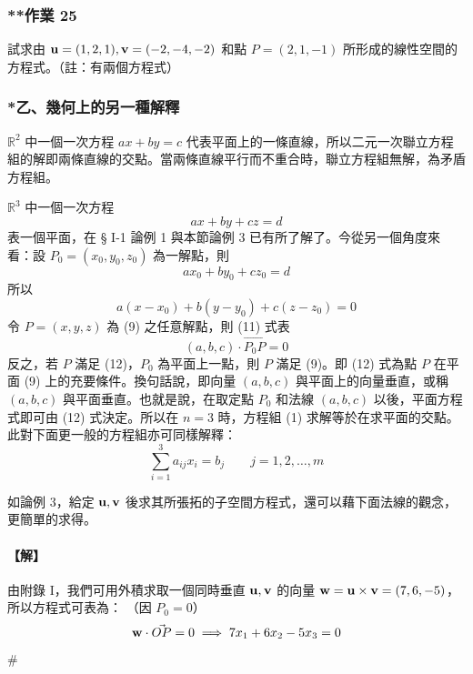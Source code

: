 \subsubsection*{**作業 25}\label{hw:b6-1-25}
試求由 $\boldsymbol{\mathbf{u}}=(1, 2, 1), \boldsymbol{\mathbf{v}}=(-2, -4, -2)$ 和點 $P=(2, 1, -1)$ 所形成的線性空間的方程式。（註：有兩個方程式）

\subsubsection*{*乙、幾何上的另一種解釋}\label{subsec:b6-1-8-b}

$\mathbb{R}^2$ 中一個一次方程 $ax+by=c$ 代表平面上的一條直線，所以二元一次聯立方程組的解即兩條直線的交點。當兩條直線平行而不重合時，聯立方程組無解，為矛盾方程組。

$\mathbb{R}^3$ 中一個一次方程
\begin{equation}
ax + by + cz = d \label{eq:b6-1-8-9}
\end{equation}
表一個平面，在 § I-1 論例 1 與本節論例 3 已有所了解了。今從另一個角度來看：設 $P_0=(x_0, y_0, z_0)$ 為一解點，則
\begin{equation}
ax_0 + by_0 + cz_0 = d \label{eq:b6-1-8-10}
\end{equation}
所以
\begin{equation}
a(x-x_0) + b(y-y_0) + c(z-z_0) = 0 \label{eq:b6-1-8-11}
\end{equation}
令 $P=(x, y, z)$ 為 (9) 之任意解點，則 (11) 式表
\begin{equation}
(a, b, c) \cdot \vec{P_0P} = 0 \label{eq:b6-1-8-12}
\end{equation}
反之，若 $P$ 滿足 (12)，$P_0$ 為平面上一點，則 $P$ 滿足 (9)。即 (12) 式為點 $P$ 在平面 (9) 上的充要條件。換句話說，即向量 $(a, b, c)$ 與平面上的向量垂直，或稱 $(a, b, c)$ 與平面垂直。也就是說，在取定點 $P_0$ 和法線 $(a, b, c)$ 以後，平面方程式即可由 (12) 式決定。所以在 $n=3$ 時，方程組 (1) 求解等於在求平面的交點。此對下面更一般的方程組亦可同樣解釋：
\begin{equation}
\sum_{i=1}^3 a_{ij} x_i = b_j \qquad j=1, 2, \dots, m \label{eq:b6-1-8-13}
\end{equation}

\begin{discussion}[**]\label{disc:b6-1-9}
如論例 3，給定 $\boldsymbol{\mathbf{u}}, \boldsymbol{\mathbf{v}}$ 後求其所張拓的子空間方程式，還可以藉下面法線的觀念，更簡單的求得。
\end{discussion}

\paragraph{【解】}
由附錄 I，我們可用外積求取一個同時垂直 $\boldsymbol{\mathbf{u}}, \boldsymbol{\mathbf{v}}$ 的向量 $\boldsymbol{\mathbf{w}} = \boldsymbol{\mathbf{u}} \times \boldsymbol{\mathbf{v}} = (7, 6, -5)$，所以方程式可表為：
（因 $P_0=0$）
\[ \boldsymbol{\mathbf{w}} \cdot \vec{OP} = 0 \implies 7x_1 + 6x_2 - 5x_3 = 0 \]\hfill$\#$

